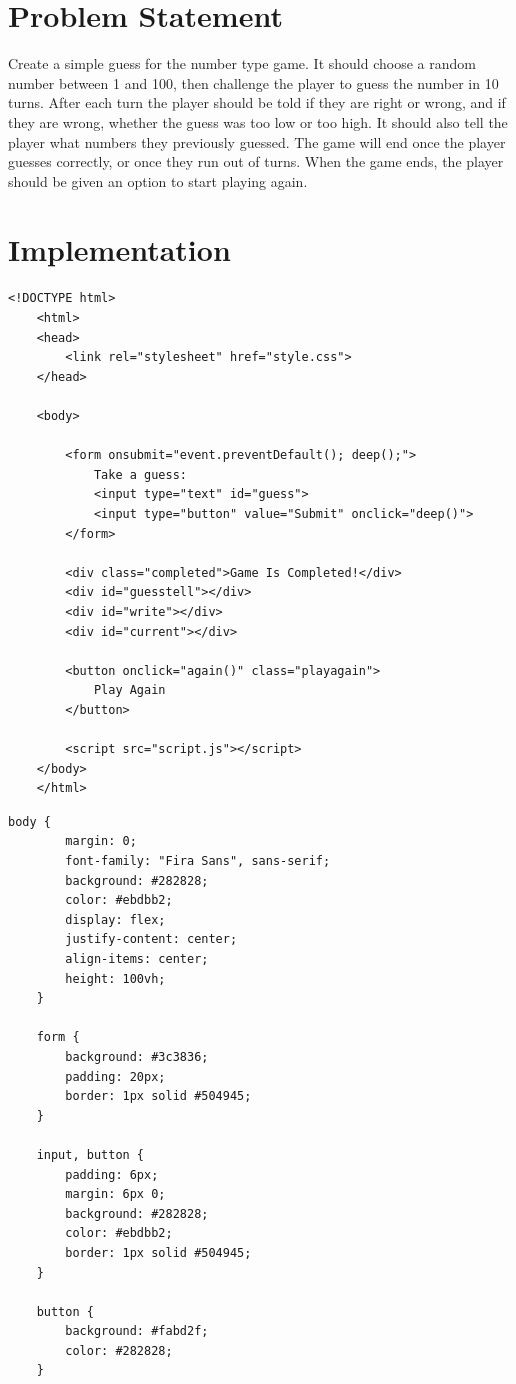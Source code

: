 \documentclass[12pt, a4paper]{report}
\begin{document}
    \section{Problem Statement}
    Create a simple guess for the number type game. It should choose a random number between 1 and 100, then challenge the player to guess the number in 10 turns. After each turn the player should be told if they are right or wrong, and if they are wrong, whether the guess was too low or too high. It should also tell the player what numbers they previously guessed. The game will end once the player guesses correctly, or once they run out of turns. When the game ends, the player should be given an option to start playing again.

    \section{Implementation}

    \begin{lstlisting}[caption={\texttt{index.html}}]
    <!DOCTYPE html>
    <html>
    <head>
        <link rel="stylesheet" href="style.css">
    </head>

    <body>

        <form onsubmit="event.preventDefault(); deep();">
            Take a guess:
            <input type="text" id="guess">
            <input type="button" value="Submit" onclick="deep()">
        </form>

        <div class="completed">Game Is Completed!</div>
        <div id="guesstell"></div>
        <div id="write"></div>
        <div id="current"></div>

        <button onclick="again()" class="playagain">
            Play Again
        </button>

        <script src="script.js"></script>
    </body>
    </html>
    \end{lstlisting}

    \begin{lstlisting}[caption={\texttt{style.css}}]
    body {
        margin: 0;
        font-family: "Fira Sans", sans-serif;
        background: #282828;
        color: #ebdbb2;
        display: flex;
        justify-content: center;
        align-items: center;
        height: 100vh;
    }

    form {
        background: #3c3836;
        padding: 20px;
        border: 1px solid #504945;
    }

    input, button {
        padding: 6px;
        margin: 6px 0;
        background: #282828;
        color: #ebdbb2;
        border: 1px solid #504945;
    }

    button {
        background: #fabd2f;
        color: #282828;
    }
    \end{lstlisting}
\end{document}
